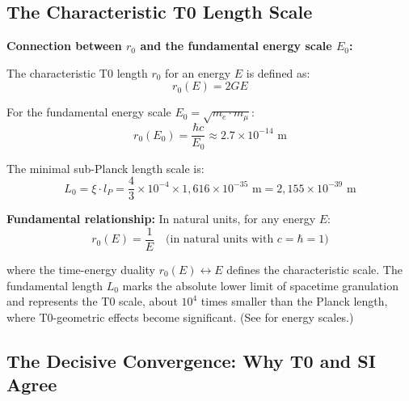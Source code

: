	\subsection{The Characteristic T0 Length Scale}
	
	\begin{insight}
		\textbf{Connection between $r_0$ and the fundamental energy scale $E_0$:}
		
		The characteristic T0 length $r_0$ for an energy $E$ is defined as:
		\begin{equation}
			r_0(E) = 2GE
		\end{equation}
		
		For the fundamental energy scale $E_0 = \sqrt{m_e \cdot m_\mu}$:
		\begin{equation}
			r_0(E_0) = \frac{\hbar c}{E_0} \approx 2.7 \times 10^{-14} \text{ m}
		\end{equation}
		
		The minimal sub-Planck length scale is:
		\begin{equation}
			\boxed{L_0 = \xi \cdot l_P = \frac{4}{3} \times 10^{-4} \times 1{,}616 \times 10^{-35} \text{ m} = 2{,}155 \times 10^{-39} \text{ m}}
		\end{equation}
		
		\textbf{Fundamental relationship:} In natural units, for any energy $E$:
		\begin{equation}
			r_0(E) = \frac{1}{E} \quad \text{(in natural units with } c = \hbar = 1\text{)}
		\end{equation}
		
		where the time-energy duality $r_0(E) \leftrightarrow E$ defines the characteristic scale. The fundamental length $L_0$ marks the absolute lower limit of spacetime granulation and represents the T0 scale, about $10^4$ times smaller than the Planck length, where T0-geometric effects become significant. (See \cite{T0_energy_En} for energy scales.)
	\end{insight}
	
	\subsection{The Decisive Convergence: Why T0 and SI Agree}
	
